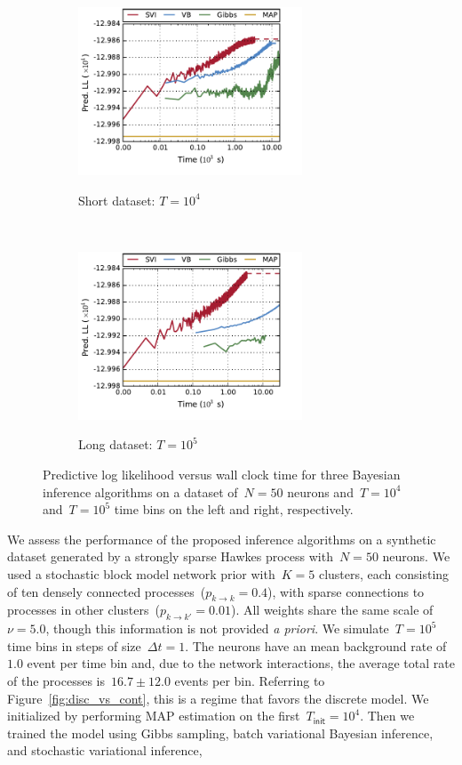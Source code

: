 \begin{figure}[t!]
  \begin{center}
    \begin{subfigure}[b]{0.48\linewidth}
      \caption{Short dataset: $T=10^4$}
      \centering
      \includegraphics[width=2.625in]{figures/ch4/figure2a.pdf} 
      \label{fig:synth_pll_short}
    \end{subfigure}
    ~
    \begin{subfigure}[b]{0.48\linewidth}
      \caption{Long dataset: $T=10^5$}
      \centering
      \includegraphics[width=2.625in]{figures/ch4/figure2b.pdf} 
      \label{fig:synth_pll_long}
    \end{subfigure}
    \caption[Predictive log likelihood versus wall clock time]{
      Predictive log likelihood versus wall clock time for three
      Bayesian inference algorithms on a dataset of~$N=50$ neurons
      and~$T=10^4$ and~$T=10^5$ time bins on the left and right,
      respectively.}
    \label{fig:synth_pll}
  \end{center}
\end{figure}


We assess the performance of the proposed inference algorithms on a
synthetic dataset generated by a strongly sparse Hawkes process
with~${N=50}$ neurons.  We used a stochastic block model network
prior with~${K=5}$ clusters, each consisting of ten densely connected
processes~(${p_{k\to k}=0.4}$), with sparse connections to processes
in other clusters~(${p_{k\to k'}=0.01}$).  All weights share the same
scale of~$\nu=5.0$, though this information is not provided \emph{a
  priori}.  We simulate~${T=10^5}$ time bins in steps of size~${\Delta
  t=1}$.  The neurons have an mean background rate of~$1.0$ event
per time bin and, due to the network interactions, the average total
rate of the processes is~$16.7 \pm 12.0$ events per bin.  Referring to
Figure~\ref{fig:disc_vs_cont}, this is a regime that favors the
discrete model.  We initialized by performing MAP estimation on the
first~$T_{\mathsf{init}}=10^4$.  Then we trained the model using Gibbs
sampling, batch variational Bayesian inference, and stochastic
variational inference,

